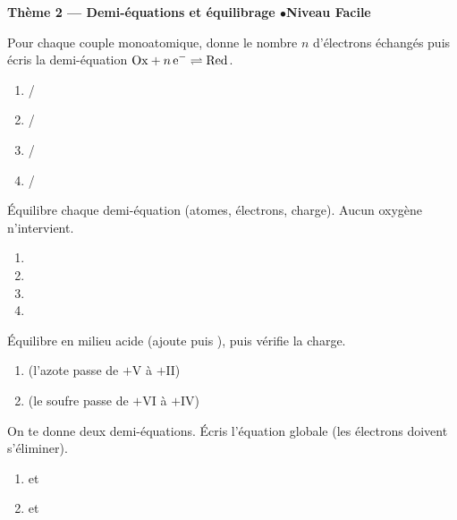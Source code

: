\documentclass[11pt,a4paper]{article}
\begin{document}
\begin{center}\color{primarydark}\large\bfseries Thème 2 — Demi-équations et équilibrage \quad$\bullet$\quad Niveau Facile\end{center}

\begin{exo}
Pour chaque couple monoatomique, donne le nombre $n$ d'électrons échangés puis écris la demi-équation
$\mathrm{Ox}+n\,\ce{e^-}\rightleftharpoons\mathrm{Red}$.
\begin{enumerate}[label=\alph*)]
  \item {}/
  \item {}/
  \item {}/
  \item {}/
\end{enumerate}
\end{exo}

\begin{exo}
Équilibre chaque demi-équation (atomes, électrons, charge). Aucun oxygène n'intervient.
\begin{enumerate}[label=\alph*)]
  \item {}
  \item {}
  \item {}
  \item {}
\end{enumerate}
\end{exo}

\begin{exo}
Équilibre en milieu acide (ajoute  puis ), puis vérifie la charge.
\begin{enumerate}[label=\alph*)]
  \item {} \quad (l'azote passe de $+\mathrm{V}$ à $+\mathrm{II}$)
  \item {} \quad (le soufre passe de $+\mathrm{VI}$ à $+\mathrm{IV}$)
\end{enumerate}
\end{exo}

\begin{exo}
On te donne deux demi-équations. Écris l'équation globale (les électrons doivent s'éliminer).
\begin{enumerate}[label=\alph*)]
  \item {} \quad et \quad {}
  \item {} \quad et \quad {}
\end{enumerate}
\end{exo}
\end{document}
